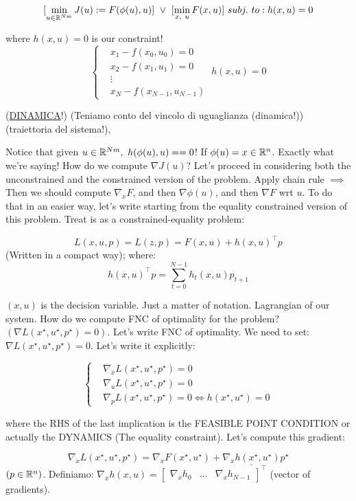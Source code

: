 \[
	[\min_{u\in\R^{Nm}}{J(u):=F(\phi(u),u)}]\ \lor\ [\min_{x,\ u}{F(x,u)}]\ subj.\ to: h(x,u)=0
\]

where $h(x,u)=0$ is our constraint!
\[
	\left\{
	\begin{aligned}
	&x_1 - f(x_0,u_0) = 0\\
	&x_2 - f(x_1,u_1) = 0\\
	&\vdots\\
	&x_N - f(x_{N-1},u_{N-1})
	\end{aligned}
	\right.\ h(x,u)=0
\]

(\underline{DINAMICA}!) (Teniamo conto del vincolo di uguaglianza (dinamica!)) (traiettoria del sistema!),

Notice that given $u\in\R^{Nm},\ h(\phi(u),u)= = 0$! If $\phi(u)=x\in\mathbb{R}^n$. Exactly what we're saying! How do we compute $\nabla{J(u)}$? Let's proceed in considering both the unconstrained and the constrained version of the problem. Apply chain rule $\implies$ Then we should compute $\nabla_x{F}$, and then $\nabla{\phi(u)}$, and then $\nabla{F}$ wrt $u$. To do that in an easier way, let's write starting from the equality constrained version of this problem. Treat is as a constrained-equality problem:

\[
	L(x,u,p) = L(z,p) = F(x,u) + h(x,u)^\top p
\]
(Written in a compact way); where:
\[
	h(x,u)^\top p = \sum_{t=0}^{N-1}{h_t(x,u)p_{t+1}}
\]

$(x,u)$ is the decision variable. Just a matter of notation. Lagrangian of our system. How do we compute FNC of optimality for the problem? $(\nabla{L(x^\star,u^\star,p^\star)} = 0)$. Let's write FNC of optimality. We need to set: $\nabla{L(x^\star,u^\star,p^\star)} = 0$. Let's write it explicitly:

\[
	\left\{
	\begin{aligned}
	&\nabla_x{L(x^\star,u^\star,p^\star)} = 0\\
	&\nabla_u{L(x^\star,u^\star,p^\star)} = 0\\
	&\nabla_p{L(x^\star,u^\star,p^\star)} = 0 \iff h(x^\star,u^\star) = 0
	\end{aligned}
	\right.
\]

where the RHS of the last implication is the FEASIBLE POINT CONDITION or actually the DYNAMICS (The equality constraint). Let's compute this gradient:

\[
	\nabla_x{L(x^\star,u^\star,p^\star)} = \nabla_x{F(x^\star,u^\star)} + \underline{\nabla_x{h(x^\star,u^\star)}}p^\star
\]
$(p\in\mathbb{R}^n)$. Definiamo: $\nabla_x{h(x,u)} = \begin{bmatrix}\nabla_x{h_0}&\dots&\nabla_x{h_{N-1}}\end{bmatrix}^\top$ (vector of gradients). 

